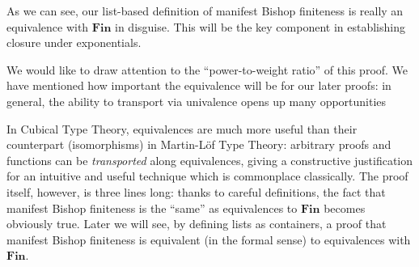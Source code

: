 As we can see, our list-based definition of manifest Bishop finiteness is really
an equivalence with \(\mathbf{Fin}\) in disguise.
This will be the key component in establishing closure under exponentials.

We would like to draw attention to the ``power-to-weight ratio'' of this proof.
We have mentioned how important the equivalence will be for our later proofs: in
general, the ability to transport via univalence opens up many opportunities 

In Cubical Type Theory, equivalences are much more useful than their counterpart
(isomorphisms) in Martin-Löf  Type Theory: arbitrary proofs and functions can be
\emph{transported} along equivalences, giving a constructive justification for
an intuitive and useful technique which is commonplace classically.
The proof itself, however, is three lines long: thanks to careful definitions,
the fact that manifest Bishop finiteness is the ``same'' as equivalences to
\(\mathbf{Fin}\) becomes obviously true.
Later we will see, by defining lists as containers, a proof that manifest Bishop
finiteness is equivalent (in the formal sense) to equivalences with
\(\mathbf{Fin}\). 
